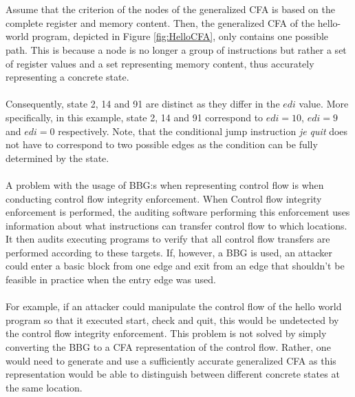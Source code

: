 \documentclass{kththesis}
\renewcommand{\it}[1]{\textit{#1}}
\begin{document}
\\ \\
Assume that the criterion of the nodes of the generalized CFA is based on the complete register and memory content. Then, the generalized CFA of the hello-world program, depicted in Figure \ref{fig:HelloCFA}, only contains one possible path. This is because a node is no longer a group of instructions but rather a set of register values and a set representing memory content, thus accurately representing a concrete state. 
\\ \\
Consequently, state 2, 14 and 91 are distinct as they differ in the $edi$ value. More specifically, in this example, state 2, 14 and 91 correspond to $edi=10$, $edi=9$ and $edi=0$ respectively. Note, that the conditional jump instruction \it{je quit} does not have to correspond to two possible edges as the condition can be fully determined by the state.
\\ \\
A problem with the usage of BBG:s when representing control flow is when conducting control flow integrity enforcement\cite{CFIEnforcement}. When Control flow integrity enforcement is performed, the auditing software performing this enforcement uses information about what instructions can transfer control flow to which locations. It then audits executing programs to verify that all control flow transfers are performed according to these targets. If, however, a BBG is used, an attacker could enter a basic block from one edge and exit from an edge that shouldn't be feasible in practice when the entry edge was used. 
\\ \\
For example, if an attacker could manipulate the control flow of the hello world program so that it executed start, check and quit, this would be undetected by the control flow integrity enforcement. This problem is not solved by simply converting the BBG to a CFA representation of the control flow. Rather, one would need to generate and use a sufficiently accurate generalized CFA as this representation would be able to distinguish between different concrete states at the same location.
\end{document}

